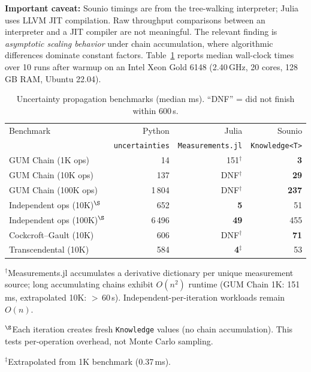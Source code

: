 \documentclass[journal]{IEEEtran}
\begin{document}
\textbf{Important caveat:} Sounio timings are from the tree-walking
interpreter; Julia uses LLVM JIT compilation. Raw throughput comparisons
between an interpreter and a JIT compiler are not meaningful.
The relevant finding is \emph{asymptotic scaling behavior} under
chain accumulation, where algorithmic differences dominate constant
factors. Table~\ref{tab:uncertainty-benchmarks} reports median
wall-clock times over 10 runs after warmup on an Intel Xeon Gold
6148 (2.40\,GHz, 20 cores, 128\,GB RAM, Ubuntu 22.04).

\begin{table}[!t]
\caption{Uncertainty propagation benchmarks (median ms). ``DNF'' = did not finish within 600\,s.}
\label{tab:uncertainty-benchmarks}
\centering
\footnotesize
\begin{tabular}{lrrr}
\toprule
Benchmark & Python & Julia & Sounio \\
 & \texttt{uncertainties} & \texttt{Measurements.jl} & \texttt{Knowledge<T>} \\
\midrule
GUM Chain (1K ops) & 14 & 151$^{\dagger}$ & \textbf{3} \\
GUM Chain (10K ops) & 137 & DNF$^{\dagger}$ & \textbf{29} \\
GUM Chain (100K ops) & 1\,804 & DNF$^{\dagger}$ & \textbf{237} \\
Independent ops (10K)$^{\S}$ & 652 & \textbf{5} & 51 \\
Independent ops (100K)$^{\S}$ & 6\,496 & \textbf{49} & 455 \\
Cockcroft--Gault (10K) & 606 & DNF$^{\dagger}$ & \textbf{71} \\
Transcendental (10K) & 584 & \textbf{4}$^{\ddagger}$ & 53 \\
\bottomrule
\end{tabular}
\smallskip

\raggedright
\footnotesize
$^{\dagger}$Measurements.jl accumulates a derivative dictionary per unique
measurement source; long accumulating chains exhibit $O(n^2)$ runtime
(GUM Chain 1K: 151\,ms, extrapolated 10K: $>$\,60\,s).
Independent-per-iteration workloads remain $O(n)$.

$^{\S}$Each iteration creates fresh \texttt{Knowledge} values (no chain
accumulation). This tests per-operation overhead, not Monte Carlo sampling.

$^{\ddagger}$Extrapolated from 1K benchmark (0.37\,ms).
\end{table}
\end{document}
